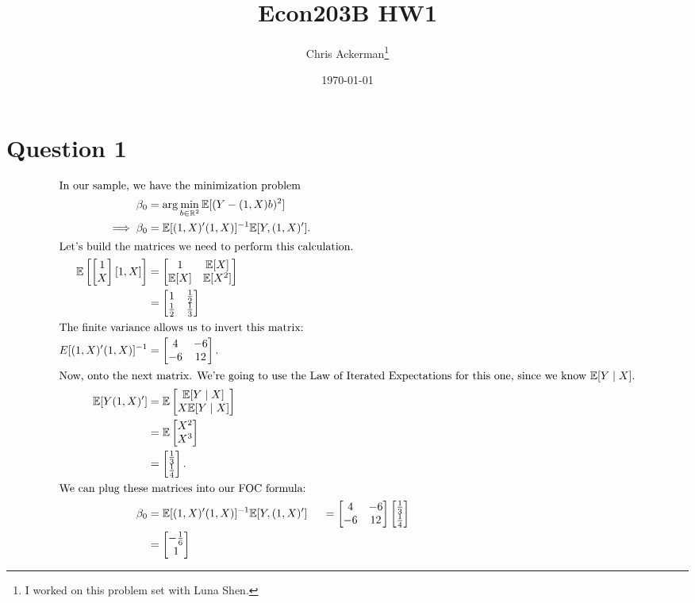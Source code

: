 \documentclass[11pt]{article}
\author{Chris Ackerman\thanks{I worked on this problem set with Luna Shen.}}
\date{\today}
\title{Econ203B HW1}
\newcommand{\R}{\mathbb{R}}
\newcommand{\E}{\mathbb{E}}
\newcommand{\inv}{^{-1}}
\begin{document}
\maketitle
\tableofcontents

\newpage

\section{Question 1}
\label{sec:org859546f}
 \begin{align*}
\intertext{In our sample, we have the minimization problem}
\beta_0 &= \arg \min_{b \in \R^2} \E [(Y - (1, X)b)^2]\\
\implies \beta_0 &= \E[(1, X)'(1, X)]\inv \E[Y, (1, X)'].\\
\intertext{Let's build the matrices we need to perform this calculation.}
\E \left[\begin{bmatrix}1\\ X \end{bmatrix}[1, X]\right] &= \begin{bmatrix}1 & \E[X] \\ \E[X] & \E[X^2]\end{bmatrix}\\
&= \begin{bmatrix}1 & \frac{1}{2} \\ \frac{1}{2} & \frac{1}{3}\end{bmatrix}\\
\intertext{The finite variance allows us to invert this matrix:}
E[(1, X)' (1, X)]\inv &= \begin{bmatrix}4 & -6\\ -6 & 12 \end{bmatrix}.\\
\intertext{Now, onto the next matrix. We're going to use the Law of Iterated Expectations for this one, since we know $\E[Y \mid X]$.}
\E[Y (1, X)'] &= \E \begin{bmatrix}\E[Y \mid X] \\ X \E [Y \mid X]\end{bmatrix}\\
&= \E \begin{bmatrix} X^2 \\ X^3 \end{bmatrix}\\
&= \begin{bmatrix}\frac{1}{3} \\ \frac{1}{4}\end{bmatrix}.\\
\intertext{We can plug these matrices into our FOC formula:}
\beta_0 &= \E[(1, X)'(1, X)]\inv \E[Y, (1, X)']\	\
&= \begin{bmatrix}4 & -6 \\ -6 & 12 \end{bmatrix}\begin{bmatrix}\frac{1}{3}\\ \frac{1}{4}\end{bmatrix}\\ &=\begin{bmatrix}- \frac{1}{6} \\ 1\end{bmatrix}
\end{align*}
\end{document}
